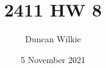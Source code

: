 \documentclass{article}
\title{2411 HW 8}
\author{Duncan Wilkie}
\date{5 November 2021}
\begin{document}
\maketitle

\section{}

\section{}
\end{document}
